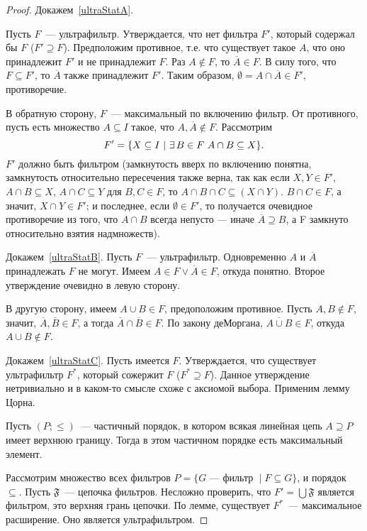 \begin{proof} Докажем~\ref{ultraStatA}.

	Пусть $F$~— ультрафильтр. Утверждается, что нет фильтра $F'$, который содержал бы $F$ ($F' \supseteq F$). Предположим противное, т.е. что существует такое $A$, что оно принадлежит $F'$ и не принадлежит $F$. Раз $A \notin F$, то $\overline{A} \in F$. В силу того, что $F \subseteq F'$, то $\overline{A}$ также принадлежит $F'$. Таким образом, $\emptyset = A \cap \overline{A} \in F'$, противоречие. 
        
	В обратную сторону, $F$~— максимальный по включению фильтр. От противного, пусть есть множество $A \subseteq I$ такое, что $A, \overline{A} \notin F$. Рассмотрим
	\[ F' = \set*{X \subseteq I\ \middle\vert\ \exists\,B \in F\ A \cap B \subseteq X}. \]
    $F'$ должно быть фильтром (замкнутость вверх по включению понятна, замкнутость относительно пересечения также верна, так как если $X, Y \in F'$, $A \cap B \subseteq X$, $A \cap C \subseteq Y$ для $B, C \in F$, то $A \cap B \cap C \subseteq (X \cap Y)$. $B \cap C \in F$, а значит, $X \cap Y \in F'$; и последнее, если $\emptyset \in F'$, то получается очевидное противоречие из того, что $A \cap B$ всегда непусто — иначе $\overline{A}\supseteq B$, а F замкнуто относительно взятия надмножеств). 
        
        Докажем~\ref{ultraStatB}. Пусть $F$~— ультрафильтр. Одновременно $A$ и $\overline{A}$ принадлежать $F$ не могут. Имеем $A \in F \vee \overline{A} \in F$, откуда понятно. Второе утверждение очевидно в левую сторону.
        
        В другую сторону, имеем $A \cup B \in F$, предоположим противное. Пусть $A, B \notin F$, значит, $\overline{A}, \overline{B} \in F$, а тогда $\overline{A} \cap \overline{B} \in F$. По закону деМоргана, $\overline{A \cup B} \in F$, откуда $A \cup B \notin F$. 

        Докажем~\ref{ultraStatC}. Пусть имеется $F$. Утверждается, что существует ультрафильтр $F^*$, который сожержит $F$ ($F^* \supseteq F$). Данное утверждение нетривиально и в каком-то смысле схоже с аксиомой выбора. Применим лемму Цорна. 
        
        \begin{lemma}[Цорн]
            Пусть $(P; \leq)$~— частичный порядок, в котором всякая линейная цепь $A \supseteq P$ имеет верхнюю границу. Тогда в этом частичном порядке есть максимальный элемент. 
        \end{lemma} 

        Рассмотрим множество всех фильтров $P = \{G\text{~— фильтр }\mid F \subseteq G\}$, и порядок $\subseteq$.
        Пусть $\mathfrak{F}$~— цепочка фильтров. Несложно проверить, что $F' = \bigcup\mathfrak{F}$ является фильтром, это верхняя грань цепочки. По лемме, существует $F^*$~— максимальное расширение. Оно является ультрафильтром.
\end{proof} 

